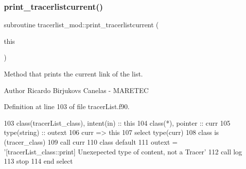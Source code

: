 \subsubsection{\texorpdfstring{print\+\_\+tracerlistcurrent()}{print\_tracerlistcurrent()}}
{\footnotesize\ttfamily subroutine tracerlist\+\_\+mod\+::print\+\_\+tracerlistcurrent (\begin{DoxyParamCaption}\item[{class(\mbox{\hyperlink{structtracerlist__mod_1_1tracerlist__class}{tracerlist\+\_\+class}}), intent(in)}]{this }\end{DoxyParamCaption})\hspace{0.3cm}{\ttfamily [private]}}



Method that prints the current link of the list. 

\begin{DoxyAuthor}{Author}
Ricardo Birjukovs Canelas -\/ M\+A\+R\+E\+T\+EC 
\end{DoxyAuthor}


Definition at line 103 of file tracer\+List.\+f90.


\begin{DoxyCode}
103     \textcolor{keywordtype}{class}(tracerList\_class), \textcolor{keywordtype}{intent(in)} :: this
104     \textcolor{keywordtype}{class}(*), \textcolor{keywordtype}{pointer} :: curr
105     \textcolor{keywordtype}{type}(string) :: outext
106     curr => this%
107     \textcolor{keywordflow}{select type}(curr)
108 \textcolor{keywordflow}{    class is} (tracer\_class)
109         \textcolor{keyword}{call }curr%
110 \textcolor{keywordflow}{    class default}
111         outext = \textcolor{stringliteral}{'[tracerList\_class::print] Unexepected type of content, not a Tracer'}
112         \textcolor{keyword}{call }log%
113         stop
114 \textcolor{keywordflow}{    end select}
\end{DoxyCode}
